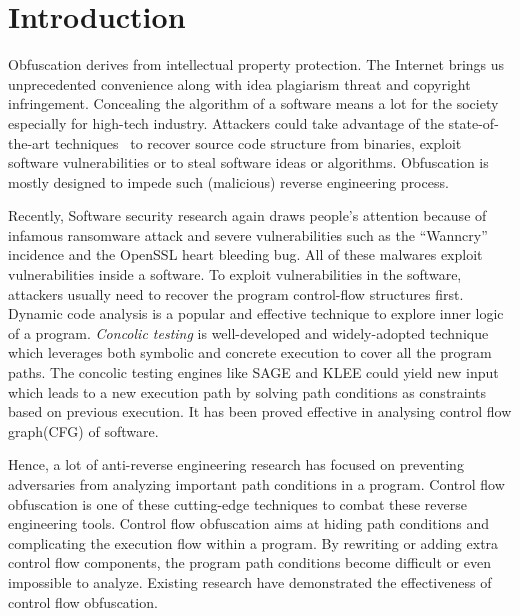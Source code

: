 \documentclass[lnicst]{svmultln}
\begin{document}
\section{Introduction}
\label{sec:introduction}
Obfuscation derives from intellectual property protection. The Internet brings
us unprecedented convenience along with idea plagiarism threat and copyright
infringement. Concealing the algorithm of a software means a lot for the society
especially for high-tech industry. Attackers could take advantage of the
state-of-the-art techniques~\cite{Loop,Lee,Molnar} to recover source code
structure from binaries, exploit software vulnerabilities or to steal software
ideas or algorithms. Obfuscation is mostly designed to impede such (malicious)
reverse engineering process.

Recently, Software security research again draws people's attention because of
infamous ransomware attack and severe vulnerabilities such as the ``Wanncry''
incidence and the OpenSSL heart bleeding bug. All of these malwares exploit
vulnerabilities inside a software. To exploit vulnerabilities in the software,
attackers usually need to recover the program control-flow structures first.
Dynamic code analysis is a popular and effective technique to explore inner
logic of a program. \textit{Concolic testing} is well-developed and
widely-adopted technique which leverages both symbolic and concrete execution to
cover all the program paths\cite{Sen}. 
The concolic
testing engines like SAGE\cite{Sage} and KLEE\cite{klee} could yield new input which leads to a new execution path by solving
path conditions as constraints based on previous execution. 
It has been proved effective in analysing control flow graph(CFG) of software\cite{Cute}.

Hence, a lot of anti-reverse engineering research has focused on preventing
adversaries from analyzing important path conditions in a
program\cite{Opaque,Sharif,Popov,Zhi, Wang:Zhi}. Control flow obfuscation is one
of these cutting-edge techniques to combat these reverse engineering tools.
Control flow obfuscation aims at hiding path conditions and complicating the
execution flow within a program. By rewriting or adding extra control flow
components, the program path conditions become difficult or even impossible to
analyze. Existing research \cite{Ma} have demonstrated the effectiveness of
control flow obfuscation.

\end{document}
